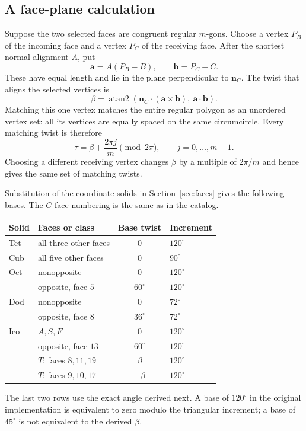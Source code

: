 \documentclass[11pt]{article}
\theoremstyle{definition}
\newcommand{\nc}{\mathbf n_C}
\newcommand{\degc}{^{\circ}}
\begin{document}
\subsection{A face-plane calculation}
Suppose the two selected faces are congruent regular $m$-gons. Choose a
vertex $P_B$ of the incoming face and a vertex $P_C$ of the receiving face.
After the shortest normal alignment $A$, put
\begin{equation}\label{eq:outvectors}
 \mathbf a=A(P_B-B),\qquad \mathbf b=P_C-C.
\end{equation}
These have equal length and lie in the plane perpendicular to $\nc$.
The twist that aligns the selected vertices is
\begin{equation}\label{eq:betarule}
 \beta=\operatorname{atan2}\!\left(
 \nc\cdot(\mathbf a\times\mathbf b),\ \mathbf a\cdot\mathbf b\right).
\end{equation}
Matching this one vertex matches the entire regular polygon as an unordered
vertex set: all its vertices are equally spaced on the same circumcircle.
Every matching twist is therefore
\begin{equation}\label{eq:matchingrule}
 \tau=\beta+\frac{2\pi j}{m}\pmod{2\pi},\qquad j=0,\ldots,m-1.
\end{equation}
Choosing a different receiving vertex changes $\beta$ by a multiple of
$2\pi/m$ and hence gives the same set of matching twists.

Substitution of the coordinate solids in Section~\ref{sec:faces} gives the
following bases. The $C$-face numbering is the same as in the catalog.
\begin{center}
\small\renewcommand{\arraystretch}{1.35}
\begin{tabular}{@{}llcl@{}}
\toprule
Solid & Faces or class & Base twist & Increment\\
\midrule
Tet & all three other faces & $0$ & $120\degc$\\
Cub & all five other faces & $0$ & $90\degc$\\
Oct & nonopposite & $0$ & $120\degc$\\
    & opposite, face $5$ & $60\degc$ & $120\degc$\\
Dod & nonopposite & $0$ & $72\degc$\\
    & opposite, face $8$ & $36\degc$ & $72\degc$\\
Ico & $A,S,F$ & $0$ & $120\degc$\\
    & opposite, face $13$ & $60\degc$ & $120\degc$\\
    & $T$: faces $8,11,19$ & $\beta$ & $120\degc$\\
    & $T$: faces $9,10,17$ & $-\beta$ & $120\degc$\\
\bottomrule
\end{tabular}
\end{center}
The last two rows use the exact angle derived next. A base of $120\degc$
in the original implementation is equivalent to zero modulo the triangular
increment; a base of $45\degc$ is not equivalent to the derived $\beta$.
\end{document}
